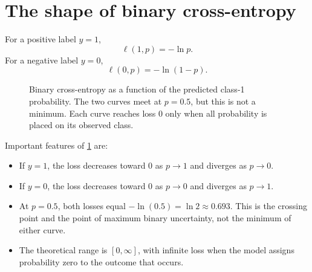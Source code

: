 \documentclass[11pt]{article}
\theoremstyle{definition}
\begin{document}
\section{The shape of binary cross-entropy}

For a positive label $y=1$,
\[
\ell(1,p)=-\ln p.
\]
For a negative label $y=0$,
\[
\ell(0,p)=-\ln(1-p).
\]

\begin{figure}[htbp]
\centering
{}
\caption{Binary cross-entropy as a function of the predicted class-1 probability. The two curves meet at $p=0.5$, but this is not a minimum. Each curve reaches loss 0 only when all probability is placed on its observed class.}
\label{fig:bce-curves}
\end{figure}

Important features of \cref{fig:bce-curves} are:
\begin{itemize}
  \item If $y=1$, the loss decreases toward 0 as $p\to1$ and diverges as $p\to0$.
  \item If $y=0$, the loss decreases toward 0 as $p\to0$ and diverges as $p\to1$.
  \item At $p=0.5$, both losses equal $-\ln(0.5)=\ln 2\approx0.693$. This is the crossing point and the point of maximum binary uncertainty, not the minimum of either curve.
  \item The theoretical range is $[0,\infty]$, with infinite loss when the model assigns probability zero to the outcome that occurs.
\end{itemize}
\end{document}
